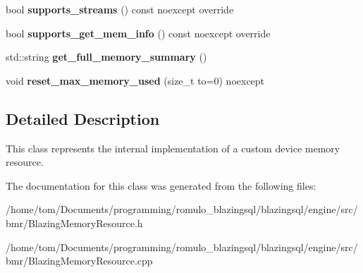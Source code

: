 \begin{DoxyCompactItemize}
\item 
\mbox{\label{classinternal__blazing__device__memory__resource_af992eee2059135f18930835c13946c66}} 
bool {\bfseries supports\+\_\+streams} () const noexcept override
\item 
\mbox{\label{classinternal__blazing__device__memory__resource_a94d5971e169b59fe3a057ab7463c8142}} 
bool {\bfseries supports\+\_\+get\+\_\+mem\+\_\+info} () const noexcept override
\item 
\mbox{\label{classinternal__blazing__device__memory__resource_aede7986d37a0b514edd25138cbfcf6a6}} 
std\+::string {\bfseries get\+\_\+full\+\_\+memory\+\_\+summary} ()
\item 
\mbox{\label{classinternal__blazing__device__memory__resource_a4ac32c22c419c2eaddc954c8b56413b7}} 
void {\bfseries reset\+\_\+max\+\_\+memory\+\_\+used} (size\+\_\+t to=0) noexcept
\end{DoxyCompactItemize}


\subsection{Detailed Description}
This class represents the internal implementation of a custom device memory resource. 

The documentation for this class was generated from the following files\+:\begin{DoxyCompactItemize}
\item 
/home/tom/\+Documents/programming/romulo\+\_\+blazingsql/blazingsql/engine/src/bmr/Blazing\+Memory\+Resource.\+h\item 
/home/tom/\+Documents/programming/romulo\+\_\+blazingsql/blazingsql/engine/src/bmr/Blazing\+Memory\+Resource.\+cpp\end{DoxyCompactItemize}
